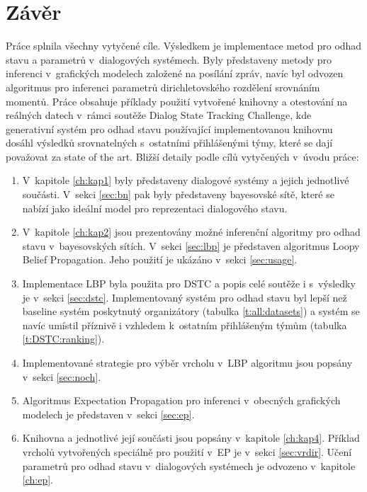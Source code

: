 \chapter*{Závěr}

Práce splnila všechny vytyčené cíle.
Výsledkem je implementace metod pro odhad stavu a parametrů v~dialogových systémech.
Byly představeny metody pro inferenci v~grafických modelech založené na posílání zpráv, navíc byl odvozen algoritmus pro inferenci parametrů dirichletovského rozdělení srovnáním momentů.
Práce obsahuje příklady použití vytvořené knihovny a otestování na reálných datech v~rámci soutěže Dialog State Tracking Challenge, kde generativní systém pro odhad stavu používající implementovanou knihovnu dosáhl výsledků srovnatelných s~ostatními přihlášenými týmy, které se dají považovat za state of the art.
Bližší detaily podle cílů vytyčených v~úvodu práce:
\begin{enumerate}

\item V~kapitole \ref{ch:kap1} byly představeny dialogové systémy a jejich jednotlivé součásti.
V~sekci \ref{sec:bn} pak byly představeny bayesovské sítě, které se nabízí jako ideální model pro reprezentaci dialogového stavu.

\item V~kapitole \ref{ch:kap2} jsou prezentovány možné inferenční algoritmy pro odhad stavu v~bayesovských sítích.
V~sekci \ref{sec:lbp} je představen algoritmus Loopy Belief Propagation.
Jeho použití je ukázáno v~sekci \ref{sec:usage}.

\item Implementace LBP byla použita pro DSTC a popis celé soutěže i s~výsledky je v~sekci \ref{sec:dstc}.
Implementovaný systém pro odhad stavu byl lepší než baseline systém poskytnutý organizátory (tabulka \ref{t:all:datasets}) a systém se navíc umístil příznivě i vzhledem k~ostatním přihlášeným týmům (tabulka \ref{t:DSTC:ranking}).

\item Implementované strategie pro výběr vrcholu v~LBP algoritmu jsou popsány v~sekci \ref{sec:noch}.

\item Algoritmus Expectation Propagation pro inferenci v~obecných grafických modelech je představen v~sekci \ref{sec:ep}.

\item Knihovna a jednotlivé její součásti jsou popsány v~kapitole \ref{ch:kap4}.
Příklad vrcholů vytvořených speciálně pro použití v~EP je v~sekci \ref{sec:vrdir}.
Učení parametrů pro odhad stavu v~dialogových systémech je odvozeno v~kapitole \ref{ch:ep}.
\end{enumerate}
